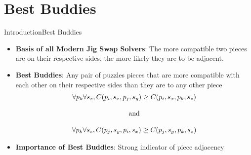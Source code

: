 \documentclass[10pt]{beamer}
\begin{document}
\section{Best Buddies}
\begin{frame}{Introduction}{Best Buddies}\label{frame:bestBuddies}
    \begin{itemize}
        \item \textbf{Basis of all Modern Jig Swap Solvers}: The more compatible two pieces are on their respective sides, the more likely they are to be adjacent.
        \vfill
        \item \textbf{Best Buddies}: Any pair of puzzles pieces that are more compatible with each other on their respective sides than they are to any other piece~\cite{pomeranz2011}
        \vfill
\begin{equation}\label{eq:pomeranzBestBuddyDefinition}
\centering
\begin{split}
	\begin{matrix}
		\forall{p_{k}}\forall{s_z},C(p_i, s_x, p_j, s_y) \geq C(p_i, s_x, p_k, s_z)
		\\
		\\
		\textnormal{and}
		\\
		\\
		\forall{p_{k}}\forall{s_z},C(p_j, s_y, p_i, s_x) \geq C(p_j, s_y, p_k, s_z)
	\end{matrix}
\end{split}
\end{equation} 
        \vfill
        \item \textbf{Importance of Best Buddies}: Strong indicator of piece adjacency
    \end{itemize}
\end{frame}
\end{document}
